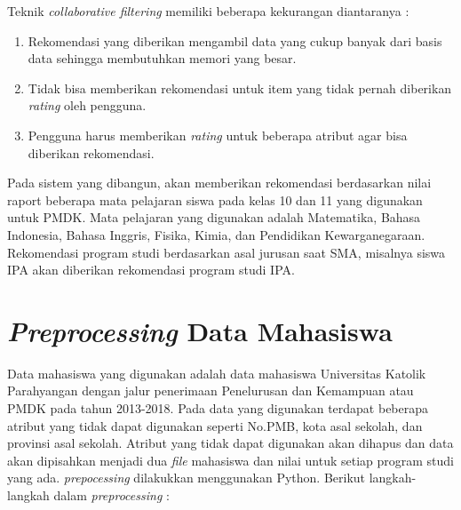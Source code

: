Teknik \textit{collaborative filtering} memiliki beberapa kekurangan diantaranya : 

\begin{enumerate}
    \item Rekomendasi yang diberikan mengambil data yang cukup banyak dari basis data sehingga membutuhkan memori yang besar.
    
    \item Tidak bisa memberikan rekomendasi untuk item yang tidak pernah diberikan \textit{rating} oleh pengguna.
    
    \item Pengguna harus memberikan \textit{rating} untuk beberapa atribut agar bisa diberikan rekomendasi.
    
\end{enumerate}

Pada sistem yang dibangun, akan memberikan rekomendasi berdasarkan nilai raport beberapa mata pelajaran siswa pada kelas 10 dan 11 yang digunakan untuk PMDK. Mata pelajaran yang digunakan adalah Matematika, Bahasa Indonesia, Bahasa Inggris, Fisika, Kimia, dan Pendidikan Kewarganegaraan. Rekomendasi program studi berdasarkan asal jurusan saat SMA, misalnya siswa IPA akan diberikan rekomendasi program studi IPA.

\section{\textit{Preprocessing} Data Mahasiswa}
\label{sec:preprocessing}
Data mahasiswa yang digunakan adalah data mahasiswa Universitas Katolik Parahyangan dengan jalur penerimaan Penelurusan dan Kemampuan atau PMDK pada tahun 2013-2018. Pada data yang digunakan terdapat beberapa atribut yang tidak dapat digunakan seperti No.PMB,  kota asal sekolah, dan provinsi asal sekolah. Atribut yang tidak dapat digunakan akan dihapus dan data akan dipisahkan menjadi dua \textit{file} mahasiswa dan nilai untuk setiap program studi yang ada. \textit{prepocessing} dilakukkan menggunakan Python. Berikut langkah-langkah dalam \textit{preprocessing} :

